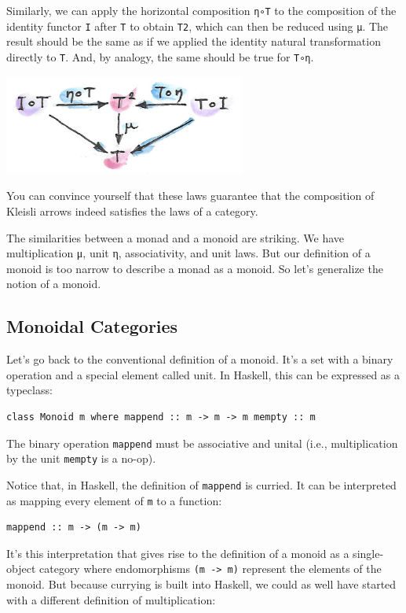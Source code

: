 Similarly, we can apply the horizontal composition \texttt{η∘T} to the
composition of the identity functor \texttt{I} after \texttt{T} to
obtain \texttt{T2}, which can then be reduced using \texttt{μ}. The
result should be the same as if we applied the identity natural
transformation directly to \texttt{T}. And, by analogy, the same should
be true for \texttt{T∘η}.

\includegraphics[width=3.12500in]{images/unitlawcomp-1.png}

You can convince yourself that these laws guarantee that the composition
of Kleisli arrows indeed satisfies the laws of a category.

The similarities between a monad and a monoid are striking. We have
multiplication μ, unit η, associativity, and unit laws. But our
definition of a monoid is too narrow to describe a monad as a monoid. So
let's generalize the notion of a monoid.

\subsection{Monoidal Categories}\label{monoidal-categories}

Let's go back to the conventional definition of a monoid. It's a set
with a binary operation and a special element called unit. In Haskell,
this can be expressed as a typeclass:

\begin{verbatim}
class Monoid m where mappend :: m -> m -> m mempty :: m
\end{verbatim}

The binary operation \texttt{mappend} must be associative and unital
(i.e., multiplication by the unit \texttt{mempty} is a no-op).

Notice that, in Haskell, the definition of \texttt{mappend} is curried.
It can be interpreted as mapping every element of \texttt{m} to a
function:

\begin{verbatim}
mappend :: m -> (m -> m)
\end{verbatim}

It's this interpretation that gives rise to the definition of a monoid
as a single-object category where endomorphisms
\texttt{(m\ -\textgreater{}\ m)} represent the elements of the monoid.
But because currying is built into Haskell, we could as well have
started with a different definition of multiplication:

